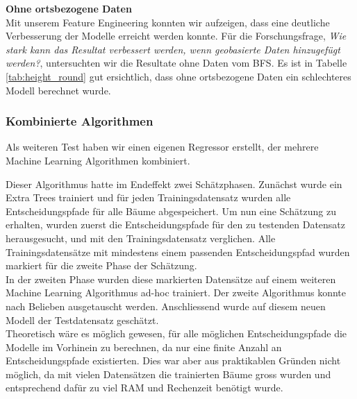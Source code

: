 \begin{table}[ht]
\centering
{}
\caption{Ergebnisse ohne ortsbezogenen Daten vom BFS}
\label{tab:height_round}
\end{table}

\textbf{Ohne ortsbezogene Daten}\\
Mit unserem Feature Engineering konnten wir aufzeigen, dass eine deutliche Verbesserung der Modelle erreicht werden konnte. Für die Forschungsfrage, \textit{Wie stark kann das Resultat verbessert werden, wenn geobasierte Daten hinzugefügt werden?}, untersuchten wir die Resultate ohne Daten vom BFS. Es ist in Tabelle \ref{tab:height_round} gut ersichtlich, dass ohne ortsbezogene Daten ein schlechteres Modell berechnet wurde.

\subsubsection{Kombinierte Algorithmen}
Als weiteren Test haben wir einen eigenen Regressor erstellt, der mehrere Machine Learning Algorithmen kombiniert.

Dieser Algorithmus hatte im Endeffekt zwei Schätzphasen. Zunächst wurde ein Extra Trees trainiert und für jeden Trainingsdatensatz wurden alle Entscheidungspfade für alle Bäume abgespeichert. Um nun eine Schätzung zu erhalten, wurden zuerst die Entscheidungspfade für den zu testenden Datensatz herausgesucht, und mit den Trainingsdatensatz verglichen. Alle Trainingsdatensätze mit mindestens einem passenden Entscheidungspfad wurden markiert für die zweite Phase der Schätzung.\\
In der zweiten Phase wurden diese markierten Datensätze auf einem weiteren Machine Learning Algorithmus ad-hoc trainiert. Der zweite Algorithmus konnte nach Belieben ausgetauscht werden. Anschliessend wurde auf diesem neuen Modell der Testdatensatz geschätzt.\\
Theoretisch wäre es möglich gewesen, für alle möglichen Entscheidungspfade die Modelle im Vorhinein zu berechnen, da nur eine finite Anzahl an Entscheidungspfade existierten. Dies war aber aus praktikablen Gründen nicht möglich, da mit vielen Datensätzen die trainierten Bäume gross wurden und entsprechend dafür zu viel RAM und Rechenzeit benötigt wurde.

